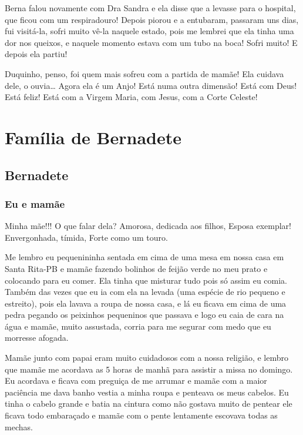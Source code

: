 \documentclass[
  brazil,
  a6paper,
  oneside,
  landscape,
  14pt]{scrbook}
\begin{document}
Berna falou novamente com Dra Sandra e ela disse que a levasse para o
hospital, que ficou com um respiradouro! Depois piorou e a entubaram,
passaram uns dias, fui visitá-la, sofri muito vê-la naquele estado, pois
me lembrei que ela tinha uma dor nos queixos, e naquele momento estava
com um tubo na boca! Sofri muito! E depois ela partiu!

Duquinho, penso, foi quem mais sofreu com a partida de mamãe! Ela
cuidava dele, o ouvia\ldots{} Agora ela é um Anjo! Está numa outra
dimensão! Está com Deus! Está feliz! Está com a Virgem Maria, com Jesus,
com a Corte Celeste!

\hypertarget{famuxedlia-de-bernadete}{%
\chapter{Família de Bernadete}\label{famuxedlia-de-bernadete}}

\hypertarget{bernadete}{%
\section{Bernadete}\label{bernadete}}

\hypertarget{eu-e-mamuxe3e}{%
\subsection{Eu e mamãe}\label{eu-e-mamuxe3e}}

Minha mãe!!! O que falar dela? Amorosa, dedicada aos filhos, Esposa
exemplar! Envergonhada, tímida, Forte como um touro.

Me lembro eu pequenininha sentada em cima de uma mesa em nossa casa em
Santa Rita-PB e mamãe fazendo bolinhos de feijão verde no meu prato e
colocando para eu comer. Ela tinha que misturar tudo pois só assim eu
comia. Também das vezes que eu ia com ela na levada (uma espécie de rio
pequeno e estreito), pois ela lavava a roupa de nossa casa, e lá eu
ficava em cima de uma pedra pegando os peixinhos pequeninos que passava
e logo eu caia de cara na água e mamãe, muito assustada, corria para me
segurar com medo que eu morresse afogada.

Mamãe junto com papai eram muito cuidadosos com a nossa religião, e
lembro que mamãe me acordava as 5 horas de manhã para assistir a missa
no domingo. Eu acordava e ficava com preguiça de me arrumar e mamãe com
a maior paciência me dava banho vestia a minha roupa e penteava os meus
cabelos. Eu tinha o cabelo grande e batia na cintura como não gostava
muito de pentear ele ficava todo embaraçado e mamãe com o pente
lentamente escovava todas as mechas.
\end{document}
